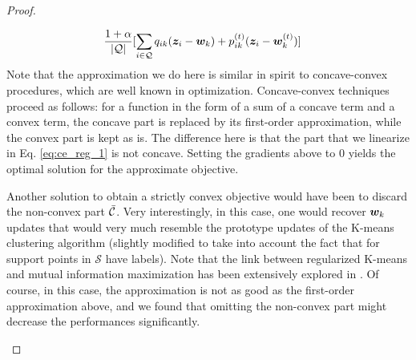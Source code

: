 \documentclass{article}
\begin{document}
\begin{proof}
\begin{itemize}
\begin{align}
    		            & \frac{1+\alpha}{|\mathcal{Q}|} [\sum_{i \in \mathcal{Q}} q_{ik}(\bm{z}_i - \bm{w}_k) + p_{ik}^{(t)}(\bm{z}_i - \bm{w}_k^{(t)})] 
    		        \end{align}
    		        Note that the approximation we do here is similar in spirit to concave-convex procedures, which are well known in optimization. Concave-convex techniques proceed as follows: for a function in the form of a sum of a concave term and a convex term, the concave part is replaced by its first-order approximation, while the convex part is kept as is. The difference here is that the part that we linearize in Eq. \eqref{eq:ce_reg_1} is not concave. 
    		        Setting the gradients above to 0 yields the optimal solution for the approximate objective. 
    		        
    		        Another solution to obtain a strictly convex objective would have been to discard the non-convex part $\Bar{\mathcal{C}}$. Very interestingly, in this case, one would recover $\bm{w}_k$ updates that would very much resemble the prototype updates of the K-means clustering algorithm (slightly modified to take into account the fact that for support points in $\mathcal{S}$ have labels). Note that the link between regularized K-means and mutual information maximization has been extensively explored in \cite{jabi}. Of course, in this case, the approximation is not as good as the first-order approximation above, and we found that omitting the non-convex part might decrease the performances significantly. 


\end{itemize}
\end{proof}
\end{document}
